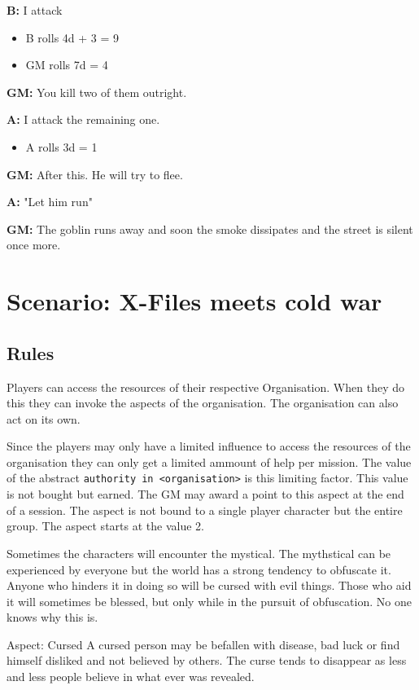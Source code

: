 \documentclass[11pt]{article}
\begin{document}
{\textbf{B:} I attack
\begin{itemize}
\item B rolls 4d + 3 = 9
\item GM rolls 7d = 4
\end{itemize}

\textbf{GM:} You kill two of them outright.

\textbf{A:} I attack the remaining one.
\begin{itemize}
\item A rolls 3d = 1
\end{itemize}

\textbf{GM:} After this. He will try to flee.

\textbf{A:} "Let him run"

\textbf{GM:} The goblin runs away and soon the smoke dissipates and the street is silent once more.

\section{Scenario: X-Files meets cold war}
\label{sec:orgdebbc39}

\subsection{Rules}
\label{sec:org27c37ed}

Players can access the resources of their respective Organisation. When they do this they can invoke the aspects of the organisation. The organisation can also act on its own.

Since the players may only have a limited influence to access the resources of the organisation they can only get a limited ammount of help per mission. The value of the abstract \texttt{authority in <organisation>}  is this limiting factor. This value is not bought but earned. The GM may award a point to this aspect at the end of a session. The aspect is not bound to a single player character but the entire group. The aspect starts at the value 2. 



Sometimes the characters will encounter the mystical. The mythstical can be experienced by everyone but the world has a strong tendency to obfuscate it. Anyone who hinders it in doing so will be cursed with evil things. Those who aid it will sometimes be blessed, but only while in the pursuit of obfuscation. No one knows why this is.

Aspect: Cursed
A cursed person may be befallen with disease, bad luck or find himself disliked and not believed by others. The curse tends to disappear as less and less people believe in what ever was revealed.

}
\end{document}
